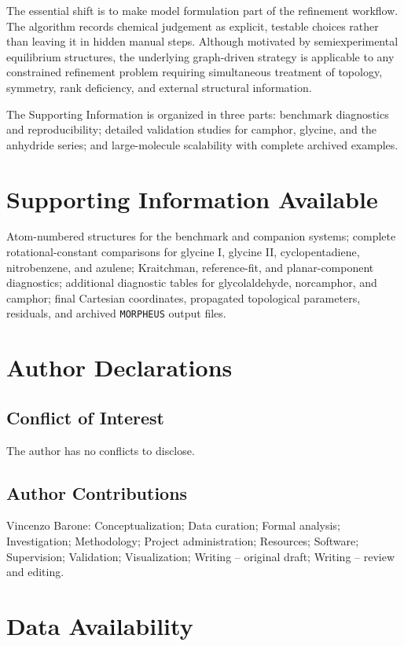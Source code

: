 \documentclass[aip,jcp,reprint,longbibliography,floatfix]{revtex4-2}
\begin{document}
The essential shift is to make model formulation part of the refinement
workflow. The algorithm records chemical judgement as explicit, testable
choices rather than leaving it in hidden manual steps. Although motivated by
semiexperimental equilibrium structures, the underlying graph-driven strategy
is applicable to any constrained refinement problem requiring simultaneous
treatment of topology, symmetry, rank deficiency, and external structural
information.

The Supporting Information is organized in three parts: benchmark diagnostics
and reproducibility; detailed validation studies for camphor, glycine, and the
anhydride series; and large-molecule scalability with complete archived
examples.

\section*{Supporting Information Available}

Atom-numbered structures for the benchmark and companion systems; complete
rotational-constant comparisons for glycine I, glycine II, cyclopentadiene,
nitrobenzene, and azulene; Kraitchman, reference-fit, and planar-component
diagnostics; additional diagnostic tables for glycolaldehyde, norcamphor, and
camphor; final Cartesian coordinates, propagated topological parameters,
residuals, and archived \texttt{MORPHEUS} output files.

\section*{Author Declarations}

\subsection*{Conflict of Interest}

The author has no conflicts to disclose.

\subsection*{Author Contributions}

Vincenzo Barone: Conceptualization; Data curation; Formal analysis;
Investigation; Methodology; Project administration; Resources; Software;
Supervision; Validation; Visualization; Writing -- original draft; Writing --
review and editing.

\section*{Data Availability}
\end{document}
